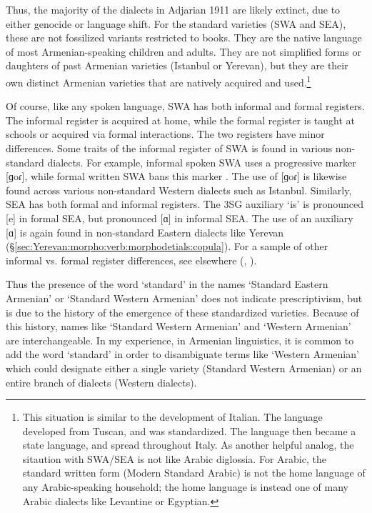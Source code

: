 Thus, the majority of the dialects in Adjarian 1911 are likely extinct, due to either genocide or language shift. For the standard varieties (SWA and SEA), these are not fossilized variants restricted to books. They are the native language of most Armenian-speaking children and adults. They are not simplified forms or daughters of past Armenian varieties (Istanbul or Yerevan), but they are their own distinct Armenian varieties that are natively acquired and used.\footnote{This situation is similar to the development of Italian. The language developed from Tuscan, and was standardized. The language then became a state language, and spread throughout Italy. As another helpful analog, the sitaution with SWA/SEA is not like Arabic diglossia. For Arabic, the standard written form (Modern Standard Arabic) is not the home language of any Arabic-speaking household; the home language is instead one of many Arabic dialects like Levantine or Egyptian.}





Of course, like any spoken language, SWA has both informal and formal registers. The informal register is acquired at home, while the formal register is taught at schools or acquired via formal interactions. The two registers have minor differences. Some traits of the informal register of SWA is found in various non-standard dialects. For example, informal spoken SWA uses a progressive marker [ɡoɾ], while formal written SWA bans this marker \citep{donabedian-2001-tabouLinguisticArmenianOccidentalGorProgressive}. The use of [ɡoɾ] is likewise found across various non-standard Western dialects such as Istanbul. Similarly, SEA has both formal and informal registers. The 3SG auxiliary `is' is pronounced [e] in formal SEA, but pronounced [ɑ] in informal SEA. The use of an auxiliary [ɑ] is again found in non-standard Eastern dialects like Yerevan (\S\ref{sec:Yerevan:morpho:verb:morphodetials:copula}). For a sample of other informal vs. formal register differences, see elsewhere (\citealt{Gharagyulyan-1981-ColloquialArmenian,Zakaryan-1981-ColloquialArmenian,Aghayan-1981-ColloquialArmenian,Kavassian-1983-CertainProblemMorphologyArmenianMontreal,DumTragut-2009-ArmenianReferenceGrammar}, \citealt[ch3]{Karapetian-2014-TeachArmenianEasternArmenianHeritage}).


Thus the presence of the word `standard' in the names `Standard Eastern Armenian' or `Standard Western Armenian' does not indicate prescriptivism, but is due to the history of the emergence of these standardized varieties. Because of this history, names like `Standard Western Armenian' and `Western Armenian' are interchangeable. In my experience, in Armenian linguistics, it is common to add the word `standard' in order to disambiguate terms like `Western Armenian' which could designate either a single variety (Standard Western Armenian) or an entire branch of dialects (Western dialects). 

